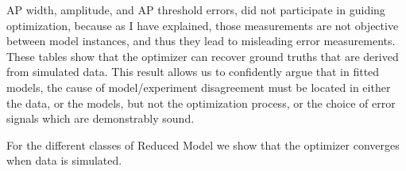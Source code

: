 \begin{table}[ht]
\centering
{}
\end{table}

AP width, amplitude, and AP threshold errors, did not participate in guiding optimization, because as I have explained, those measurements are not objective between model instances, and thus they lead to misleading error measurements. These tables show that the optimizer can recover ground truths that are derived from simulated data. This result allows us to confidently argue that in fitted models, the cause of model/experiment disagreement must be located in either the data, or the models, but not the optimization process, or the choice of error signals which are demonstrably sound.








For the different classes of Reduced Model we show that the optimizer converges when data is simulated.

